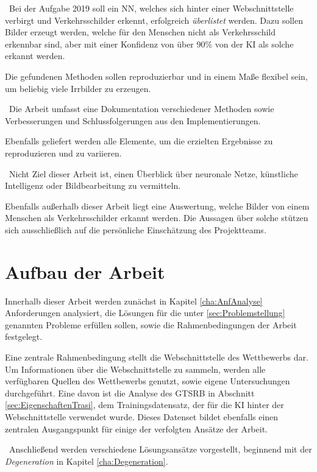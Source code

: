 ~\newline Bei der Aufgabe 2019 soll ein \ac{NN}, welches sich hinter einer Webschnittstelle verbirgt und Verkehrsschilder erkennt, erfolgreich \textit{überlistet} werden. Dazu sollen Bilder erzeugt werden, welche für den Menschen nicht als Verkehrsschild erkennbar sind, aber mit einer Konfidenz von über 90\% von der \ac{KI} als solche erkannt werden. 

Die gefundenen Methoden sollen reproduzierbar und in einem Maße flexibel sein, um beliebig viele Irrbilder zu erzeugen. 

~\newline Die Arbeit umfasst eine Dokumentation verschiedener Methoden sowie Verbesserungen und Schlussfolgerungen aus den Implementierungen. 

Ebenfalls geliefert werden alle Elemente, um die erzielten Ergebnisse zu reproduzieren und zu variieren. 

~\newline Nicht Ziel dieser Arbeit ist, einen Überblick über neuronale Netze, künstliche Intelligenz oder Bildbearbeitung zu vermitteln. 

Ebenfalls außerhalb dieser Arbeit liegt eine Auswertung, welche Bilder von einem Menschen als Verkehrsschilder erkannt werden. Die Aussagen über solche stützen sich ausschließlich auf die persönliche Einschätzung des Projektteams. 
\section{Aufbau der Arbeit}
Innerhalb dieser Arbeit werden zunächst in Kapitel \ref{cha:AnfAnalyse} Anforderungen analysiert, die Lösungen für die unter \ref{sec:Problemstellung} genannten Probleme erfüllen sollen, sowie die Rahmenbedingungen der Arbeit festgelegt. 

Eine zentrale Rahmenbedingung stellt die Webschnittstelle des Wettbewerbs dar. Um Informationen über die Webschnittstelle zu sammeln, werden alle verfügbaren Quellen des Wettbewerbs genutzt, sowie eigene Untersuchungen durchgeführt. Eine davon ist die Analyse des \ac{GTSRB} in Abschnitt \ref{sec:EigenschaftenTrasi}, dem Trainingsdatensatz, der für die \ac{KI} hinter der Webschnittstelle verwendet wurde. Dieses Datenset bildet ebenfalls einen zentralen Ausgangspunkt für einige der verfolgten Ansätze der Arbeit.

~\newline Anschließend werden verschiedene Lösungsansätze vorgestellt, beginnend mit der \textit{Degeneration} in Kapitel \ref{cha:Degeneration}. 

